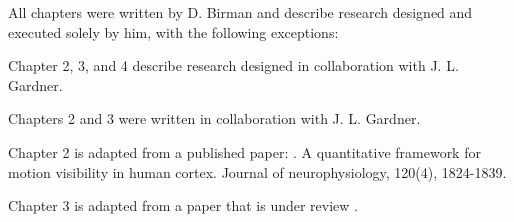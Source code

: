 All chapters were written by D. Birman and describe research designed and executed solely by him, with the following exceptions:

Chapter 2, 3, and 4 describe research designed in collaboration with J. L. Gardner. 

Chapters 2 and 3 were written in collaboration with J. L. Gardner. 

Chapter 2 is adapted from a published paper: \citet{Birman2018-sp}. A quantitative framework for motion visibility in human cortex. Journal of neurophysiology, 120(4), 1824-1839.

Chapter 3 is adapted from a paper that is under review \citet{Birman_undated-vk}.
